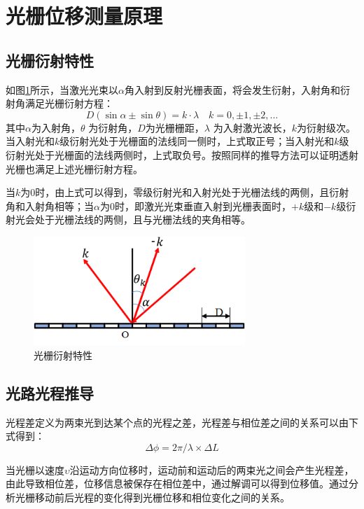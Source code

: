 \documentclass[type=master,oneside]{fduthesis}
\begin{document}
\section{光栅位移测量原理}
\subsection{光栅衍射特性}
如图\ref{fig:光栅衍射特性}所示，当激光光束以$\alpha $角入射到反射光栅表面，将会发生衍射，入射角和衍射角满足光栅衍射方程：
\begin{equation}
  D(\sin \alpha \pm\sin \theta)=k \cdot \lambda \quad k=0,\pm1,\pm2, \ldots
\end{equation}
其中$\alpha $为入射角，$\theta $ 为衍射角，$D$为光栅栅距，$\lambda $ 为入射激光波长，$k$为衍射级次。当入射光和$k$级衍射光处于光栅面的法线同一侧时，上式取正号；当入射光和$k$级衍射光处于光栅面的法线两侧时，上式取负号。按照同样的推导方法可以证明透射光栅也满足上述光栅衍射方程。

当$k$为0时，由上式可以得到，零级衍射光和入射光处于光栅法线的两侧，且衍射角和入射角相等；当$\alpha $为0时，即激光光束垂直入射到光栅表面时，$+k$级和$-k$级衍射光会处于光栅法线的两侧，且与光栅法线的夹角相等。
\begin{figure}[H]
  \centering
  \includegraphics[width=8cm]{2-fig/光栅衍射特性.png}
  \caption{光栅衍射特性}
  \label{fig:光栅衍射特性}
\end{figure}

\subsection{光路光程推导}
光程差定义为两束光到达某个点的光程之差，光程差与相位差之间的关系可以由下式得到：
\begin{equation}
  \Delta \phi =2 \pi / \lambda \times \Delta L
\end{equation}

当光栅以速度$\upsilon $沿运动方向位移时，运动前和运动后的两束光之间会产生光程差，由此导致相位差，位移信息被保存在相位差中，通过解调可以得到位移值。通过分析光栅移动前后光程的变化得到光栅位移和相位变化之间的关系。
\end{document}
